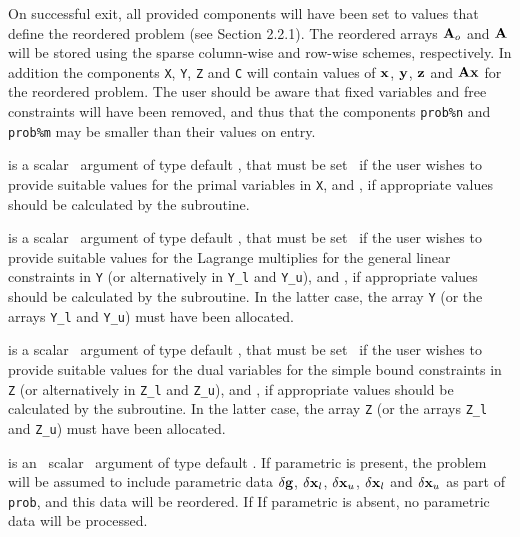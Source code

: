 \documentclass{galahad}
\begin{document}
\begin{description}

On successful exit, all provided components will have been set to values 
that define the reordered problem (see Section 2.2.1). The reordered 
arrays ${\mathbf{A}}_o$ and ${\mathbf{A}}$ will be stored using the sparse column-wise and 
row-wise schemes, respectively. In addition the components
{\tt X}, {\tt Y}, {\tt Z} and {\tt C} will contain values of 
${\mathbf{x}}$, ${\mathbf{y}}$, ${\mathbf{z}}$ and ${\mathbf{A}} {\mathbf{x}}$ for the reordered problem. 
The user should be aware that fixed variables and free constraints will have 
been removed, and thus that the components {\tt prob\%n} and {\tt prob\%m} 
may be smaller than their values on entry. 

 is a scalar \intentin\ argument of type default \logical, that 
must be set \false\ if the user wishes to provide suitable values for the 
primal variables in {\tt X}, and \true, if appropriate values should be 
calculated by the subroutine. 
 
 is a scalar \intentin\ argument of type default \logical, that 
must be set \false\ if the user wishes to provide suitable values for the 
Lagrange multiplies for the general linear constraints in {\tt Y}
(or alternatively in {\tt Y\_l} and {\tt Y\_u}), 
and \true, if appropriate values should be calculated by the subroutine. 
In the latter case, the array {\tt Y} (or the arrays {\tt Y\_l} and {\tt Y\_u})
must have been allocated.
 
 is a scalar \intentin\ argument of type default \logical, that 
must be set \false\ if the user wishes to provide suitable values for the 
dual variables for the simple bound constraints in {\tt Z}
(or alternatively in {\tt Z\_l} and {\tt Z\_u}), and \true, 
if appropriate values should be calculated by the subroutine. 
In the latter case, the array {\tt Z} (or the arrays {\tt Z\_l} and {\tt Z\_u})
must have been allocated.

is an \optional\ scalar \intentin\ argument of type default \logical. 
If {parametric} is present, the problem will be assumed to include
parametric data $\delta {\mathbf{g}}$, $\delta {\mathbf{x}}_l$, $\delta {\mathbf{x}}_u$, 
$\delta {\mathbf{x}}_l$ and $\delta {\mathbf{x}}_u$ as part of {\tt prob},
and this data will be reordered. If 
If {parametric} is absent, no parametric data will be processed.
 
\end{description}
\end{document}
